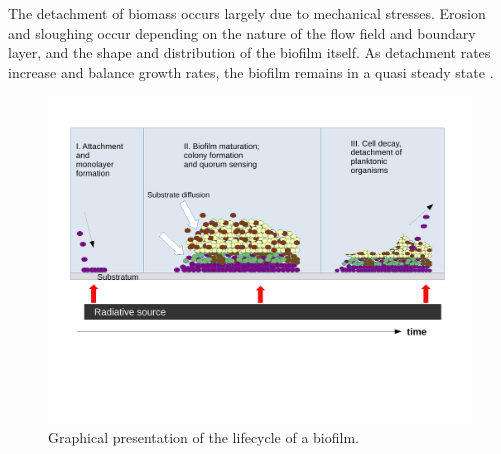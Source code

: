 \skippingparagraph
The detachment of biomass occurs largely due to mechanical stresses. Erosion and sloughing occur depending on the nature of the flow field and boundary layer, and the shape and distribution of the biofilm itself. As detachment rates increase and balance growth rates, the biofilm remains in a quasi steady state \cite{Xavier2005, Storck2015}.

\begin{figure}[H]
    \centering
    \includegraphics[width=\textwidth,trim={0 5cm 0 0},clip]{Chap4/results/biofilm_process.pdf}
    \caption{Graphical presentation of the lifecycle of a biofilm.} 
    \label{fig:biofilm_process}
\end{figure}


